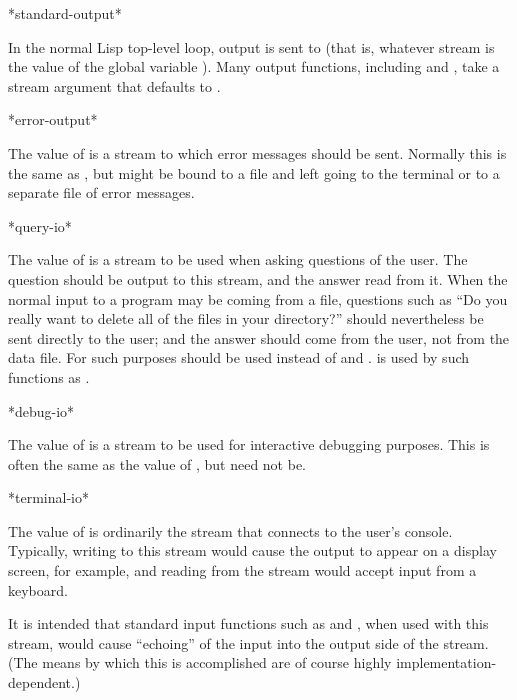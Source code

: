 \begin{defun}[Variable]
*standard-output*

In the normal Lisp top-level loop, output is sent to
 (that is, whatever stream is the value of the global
variable ).  Many output functions, including
 and , take a stream argument that defaults
to .
\end{defun}

\begin{defun}[Variable]
*error-output*

The value of  is a stream to which error messages
should be sent.  Normally this is the same as ,
but  might be bound to a file and 
left going to the terminal or to a separate file of error messages.
\end{defun}

\begin{defun}[Variable]
*query-io*

The value of  is a stream to be used when
asking questions of the user.  The question should be output to this
stream, and the answer read from it.  When
the normal input to a program may be coming from a file, questions such
as ``Do you really want to delete all of the files in your directory?'' should
nevertheless
be sent directly to the user; and the answer should come from the user,
not from the data file.  For such purposes  should be
used instead of  and .
 is used by such functions
as .
\end{defun}

\begin{defun}[Variable]
*debug-io*

The value of  is a stream to be used for interactive
debugging purposes.  This is often the same as the value of ,
but need not be.
\end{defun}

\begin{defun}[Variable]
*terminal-io*

The value of  is ordinarily
the stream that connects to the user's console.
Typically, writing to this stream would cause the output to appear
on a display screen, for example, and reading from the stream would
accept input from a keyboard.

It is intended
that standard input functions such as  and ,
when used with this stream, would cause ``echoing'' of the input
into the output side of the stream.  (The means by which this is
accomplished are of course highly implementation-dependent.)
\end{defun}

